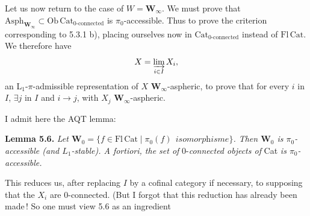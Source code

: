 Let us now return to the case of $W = \mathbf{W}_\infty$. We must prove that $\mathrm{Asph}_{\mathbf{W}_\infty} \subset \mathrm{Ob}\,\mathrm{Cat}_{\text{0-connected}}$ is $\pi_0$-accessible. Thus to prove the criterion corresponding to 5.3.1 b), placing ourselves now in $\mathrm{Cat}_{\text{0-connected}}$ instead of $\mathrm{Fl}\,\mathrm{Cat}$. We therefore have
\[
X = \varinjlim_{i\in I} X_i,
\]
an L$_1$-$\pi$-admissible representation of $X$ $\mathbf{W}_\infty$-aspheric, to prove that for every $i$ in $I$, $\exists j$ in $I$ and $i \longrightarrow j$, with $X_j$ $\mathbf{W}_\infty$-aspheric.

I admit here the AQT lemma:

\textbf{Lemma 5.6.} \textit{Let $\mathbf{W}_0 = \{f \in \mathrm{Fl}\,\mathrm{Cat} \mid \pi_0(f) \ \ \textit{isomorphisme}\}$. Then $\mathbf{W}_0$ is $\pi_0$-accessible (and $L_1$-stable). A fortiori, the set of} 0-\textit{connected objects of} Cat \textit{is $\pi_0$-accessible.}

This reduces us, after replacing $I$ by a cofinal category if necessary, to supposing that the $X_i$ are 0-connected. (But I forgot that this reduction has already been made\,! So one must view 5.6 as an ingredient